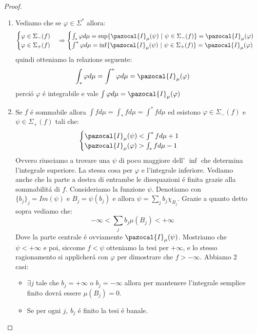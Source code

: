\documentclass[11pt,a4paper]{report}
\theoremstyle{plain}
\theoremstyle{definition}
\newcommand{\I}{\pazocal{I}}
\begin{document}
\begin{proof}
	\begin{enumerate}
		\item Vediamo che se $\varphi \in \Sigma^*$ allora:
		\[
			\begin{cases}
				\varphi \in \Sigma_-(f)\\
				\varphi \in \Sigma_+(f)
			\end{cases}	\Rightarrow
			\begin{cases}
				\int_*\varphi d\mu = \sup\{\I_\mu(\psi)\ |\ \psi \in \Sigma_-(f)\} = \I_\mu(\varphi)\\
				\int^*\varphi d\mu = \inf\{\I_\mu(\psi)\ |\ \psi \in \Sigma_+(f)\} = \I_\mu(\varphi)
			\end{cases}
		\]
		quindi otteniamo la relazione seguente:
		\[
			\int_*\varphi d\mu = \int^*\varphi d\mu = \I_\mu(\varphi)
		\]
		perci\'o $\varphi$ \'e  integrabile e vale $\int \varphi d\mu = \I_\mu(\varphi)$
		
		\item Se $f$ \'e sommabile allora $\int f d\mu = \int_*f d\mu = \int^*f d\mu$ ed esistono $\varphi \in \Sigma_-(f)$ e $\psi \in \Sigma_+(f)$ tali che:
		\[
			\begin{cases}
				\I_\mu(\psi) < \int^*f d\mu + 1\\
				\I_\mu(\varphi) > \int_*f d\mu - 1
			\end{cases}		
		\]
		Ovvero riusciamo a trovare una $\psi$ di poco maggiore dell' $\inf$ che determina l'integrale superiore. La stessa cosa per $\varphi$ e l'integrale inferiore. Vediamo anche che la parte a destra di entrambe le disequazioni \'e finita  grazie alla sommabilit\'a di $f$.
		Consideriamo la funzione $\psi$. Denotiamo con $\{b_j\}_j = Im(\psi)$ e $B_j = \psi({b_j})$ e allora $\psi = \sum\limits_j b_j\chi_{B_j}$. Grazie a quanto detto sopra vediamo che:
	\begin{equation}
			-\infty < \sum\limits_j b_j\mu(B_j) < +\infty
	\end{equation}
		Dove la parte centrale \'e ovviamente $\I_\mu(\psi)$.
		Mostriamo che $\psi < +\infty$ e poi, siccome $f < \psi$ otteniamo la tesi per $+\infty$, e lo stesso ragionamento si applicher\'a con $\varphi$ per dimostrare che $f > -\infty$.
		Abbiamo 2 casi:
		\begin{itemize}
			\item $\exists j$ tale che $b_j = +\infty$ o $b_j = -\infty$ allora per mantenere l'integrale semplice finito dovr\'a essere $\mu(B_j) = 0$.
			\item Se per ogni $j,\ b_j$ \'e finito la tesi \'e banale. 
		\end{itemize}
	\end{enumerate}
\end{proof}
\end{document}
